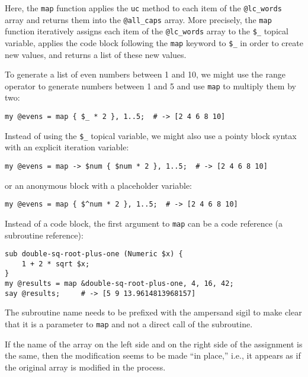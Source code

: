 Here, the {\tt map} function applies the {\tt uc} method to 
each item of the \verb'@lc_words' array and returns them 
into the \verb'@all_caps' array. More precisely, the {\tt map} 
function iteratively assigns each item of the \verb'@lc_words' 
array to the \verb'$_' topical variable, applies the 
code block following the {\tt map} keyword to \verb'$_' in 
order to create new values, and returns a list of these new 
values.

To generate a list of even numbers between 1 and 10, we 
might use the range operator to generate numbers 
between 1 and 5 and use {\tt map} to multiply them by two:

\begin{verbatim}
my @evens = map { $_ * 2 }, 1..5;  # -> [2 4 6 8 10]
\end{verbatim}
%

Instead of using the \verb'$_' topical variable, we might 
also use a pointy block syntax with an explicit iteration 
variable:

\begin{verbatim}
my @evens = map -> $num { $num * 2 }, 1..5;  # -> [2 4 6 8 10]
\end{verbatim}
%

or an anonymous block with a placeholder variable:

\begin{verbatim}
my @evens = map { $^num * 2 }, 1..5;  # -> [2 4 6 8 10]
\end{verbatim}
%

Instead of a code block, the first argument to {\tt map} can 
be a code reference (a subroutine reference):

\begin{verbatim}
sub double-sq-root-plus-one (Numeric $x) { 
    1 + 2 * sqrt $x;
}
my @results = map &double-sq-root-plus-one, 4, 16, 42;
say @results;     # -> [5 9 13.9614813968157]
\end{verbatim}
%

The subroutine name needs to be prefixed with the ampersand 
sigil to make clear that it is a parameter to {\tt map} and 
not a direct call of the subroutine.

If the name of the array on the left side and on the right 
side of the assignment is the same, then the modification 
seems to be made ``in place,'' i.e., it appears as if the 
original array is modified in the process.


